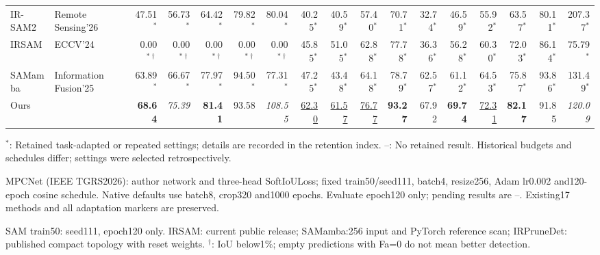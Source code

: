 \begin{table}[!t]
{\begin{tabular}{ll|rrrrr|rrrrr|rrrrr}
IR-SAM2 & Remote Sensing'26 & 47.51$^{*}$ & 56.73$^{*}$ & 64.42$^{*}$ & 79.82$^{*}$ & 80.04$^{*}$ & 40.25$^{*}$ & 40.59$^{*}$ & 57.40$^{*}$ & 70.71$^{*}$ & 32.74$^{*}$ & 46.59$^{*}$ & 55.92$^{*}$ & 63.57$^{*}$ & 80.11$^{*}$ & 207.37$^{*}$ \\
IRSAM & ECCV'24 & 0.00$^{*\dagger}$ & 0.00$^{*\dagger}$ & 0.00$^{*\dagger}$ & 0.00$^{*\dagger}$ & 0.00$^{*\dagger}$ & 45.85$^{*}$ & 51.05$^{*}$ & 62.88$^{*}$ & 77.78$^{*}$ & 36.36$^{*}$ & 56.28$^{*}$ & 60.30$^{*}$ & 72.03$^{*}$ & 86.14$^{*}$ & 75.79$^{*}$ \\
SAMamba & Information Fusion'25 & 63.89$^{*}$ & 66.67$^{*}$ & 77.97$^{*}$ & 94.50$^{*}$ & 77.31$^{*}$ & 47.25$^{*}$ & 43.48$^{*}$ & 64.18$^{*}$ & 78.79$^{*}$ & 62.57$^{*}$ & 61.12$^{*}$ & 64.53$^{*}$ & 75.87$^{*}$ & 93.86$^{*}$ & 131.49$^{*}$ \\
Ours &  & \textbf{68.64} & \textit{75.39} & \textbf{81.41} & 93.58 & \textit{108.55} & \underline{62.30} & \underline{61.57} & \underline{76.77} & \textbf{93.27} & 67.92 & \textbf{69.74} & \underline{72.31} & \textbf{82.17} & 91.85 & \textit{120.09} \\
\hline
\end{tabular}}
\endgroup
\par\smallskip
\noindent\parbox{\linewidth}{\raggedright\footnotesize $^{*}$: Retained task-adapted or repeated settings; details are recorded in the retention index. --: No retained result. Historical budgets and schedules differ; settings were selected retrospectively.\par}
\par\footnotesize MPCNet (IEEE TGRS2026): author network and three-head SoftIoULoss; fixed train50/seed111, batch4, resize256, Adam lr0.002 and120-epoch cosine schedule. Native defaults use batch8, crop320 and1000 epochs. Evaluate epoch120 only; pending results are --. Existing17 methods and all adaptation markers are preserved.
\par\footnotesize SAM train50: seed111, epoch120 only. IRSAM: current public release; SAMamba:256 input and PyTorch reference scan; IRPruneDet: published compact topology with reset weights. $^{\dagger}$: IoU below1\%; empty predictions with Fa=0 do not mean better detection.
\end{table}
